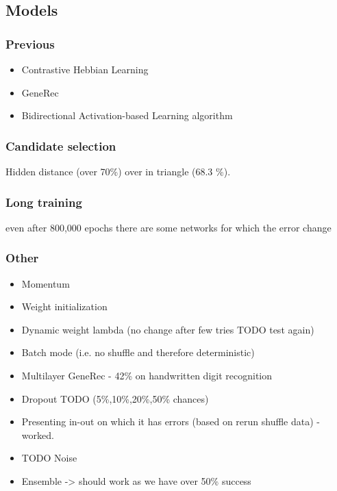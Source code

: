 \subsection{Models}

\subsubsection{Previous} 

\begin{itemize} 
\item Contrastive Hebbian Learning
\item GeneRec 
\item Bidirectional Activation-based Learning algorithm
\end{itemize}  

\subsubsection{Candidate selection} 
Hidden distance (over 70\%) over in triangle (68.3 \%). 


  
\subsubsection{Long training} 
even after 800,000 epochs there are some networks for which the error change

\subsubsection{Other} 
\begin{itemize} 
\item Momentum
\item Weight initialization 
\item Dynamic weight lambda (no change after few tries TODO test again) 
\item Batch mode (i.e. no shuffle and therefore deterministic)
\item Multilayer GeneRec - 42\% on handwritten digit recognition 
\item Dropout TODO (5\%,10\%,20\%,50\% chances)
\item Presenting in-out on which it has errors (based on rerun shuffle data) - worked. 
\item TODO Noise 
\item Ensemble -> should work as we have over 50\% success
\end{itemize} 

